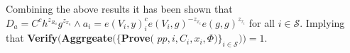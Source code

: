 Combining the above results it has been shown that $D_a  = C^ch^{z_R_a}g^{z_x_a}\wedge a_i = e(V_i,y)^c_i e(V_i,g)^{-z_{x_i}}e(g,g)^{z_{\tau_i}}$ for all $i\in\mathcal{S}$.
Implying that \textbf{Verify}$ ( $\textbf{Aggrgeate}$ (\{ $\textbf{Prove}$($
$pp,i,C_i,x_i,\Phi)\}_{i\in\mathcal{S}}) )= 1$.



